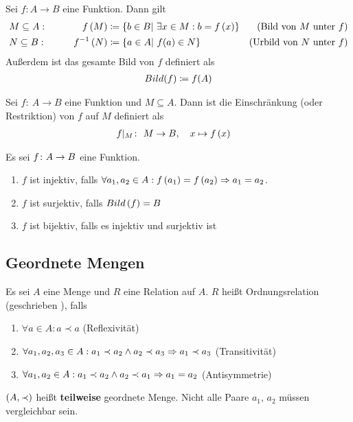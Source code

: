 \begin{notation}
    Sei $f: A\rightarrow B$ eine Funktion.
    Dann gilt
    \begin{align*}
        &M \subseteq A:\qquad &f\left(M\right) &\coloneqq \left\{b\in B|~\exists x\in M: b=f\left(x\right)\right\}& (\text{Bild von } M \text{ unter } f)\\
        &N \subseteq B:\qquad &f^{-1}\left(N\right) &\coloneqq \left\{a\in A|~f(a)\in N\right\}& (\text{Urbild von } N \text{ unter } f)
    \end{align*}
    Außerdem ist das gesamte Bild von $f$ definiert als
    \begin{align*}
        Bild(f) \coloneqq f(A)
    \end{align*}
\end{notation}
\begin{definition}
    Sei $f\colon~A \rightarrow B$ eine Funktion und $M \subseteq A$.
    Dann ist die Einschränkung (oder Restriktion) von $f$ auf $M$ definiert als
    \begin{align*}
        f|_{M}\colon&~M \rightarrow B,\quad x \mapsto f\left(x\right)
    \end{align*}
\end{definition}
\begin{definition}
    Es sei $f\colon A\rightarrow{} B$ eine Funktion.
    \theoremescape
    \begin{enumerate}[label=(\roman*)]
        \item $f$ ist injektiv, falls $\forall a_1, a_2 \in A: f\left(a_1\right) = f\left(a_2\right) \Rightarrow{} a_1 = a_2$.
        \item $f$ ist surjektiv, falls $Bild\left(f\right) = B$
        \item $f$ ist bijektiv, falls es injektiv und surjektiv ist
    \end{enumerate}
\end{definition}

\subsection{Geordnete Mengen}

\begin{definition}
    Es sei $A$ eine Menge und $R$ eine Relation auf $A$. $R$ heißt Ordnungsrelation (geschrieben \anf{$\prec$}), falls
    \begin{enumerate}[label=(\roman*)]
        \item $\forall a\in A: a \prec a$ (Reflexivität)
        \item $\forall a_1, a_2, a_3\in A: a_1\prec a_2 \land a_2 \prec a_3 \Rightarrow{} a_1 \prec a_3$ (Transitivität)
        \item $\forall a_1, a_2\in A: a_1\prec a_2 \land a_2 \prec a_1 \Rightarrow{} a_1 = a_2$ (Antisymmetrie)
    \end{enumerate}
    $\left(A, \prec\right)$ heißt \textbf{teilweise} geordnete Menge. Nicht alle Paare $a_1$, $a_2$ müssen vergleichbar sein.
\end{definition}


